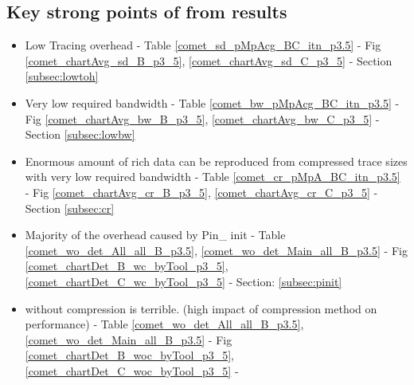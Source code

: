 \subsection{Key strong points of \parlot from results}

\begin{itemize}
\item Low Tracing overhead - Table \ref{comet_sd_pMpAcg_BC_itn_p3.5} - Fig \ref{comet_chartAvg_sd_B_p3_5}, \ref{comet_chartAvg_sd_C_p3_5} - Section \ref{subsec:lowtoh}
\item Very low required bandwidth - Table \ref{comet_bw_pMpAcg_BC_itn_p3.5} - Fig \ref{comet_chartAvg_bw_B_p3_5}, \ref{comet_chartAvg_bw_C_p3_5} - Section \ref{subsec:lowbw}
\item Enormous amount of rich data can be reproduced from compressed trace sizes with very low required bandwidth - Table \ref{comet_cr_pMpA_BC_itn_p3.5} - Fig \ref{comet_chartAvg_cr_B_p3_5}, \ref{comet_chartAvg_cr_C_p3_5} - Section \ref{subsec:cr}
\item Majority of the overhead caused by Pin\_ init - Table \ref{comet_wo_det_All_all_B_p3.5}, \ref{comet_wo_det_Main_all_B_p3.5} - Fig \ref{comet_chartDet_B_wc_byTool_p3_5}, \ref{comet_chartDet_C_wc_byTool_p3_5} - Section: \ref{subsec:pinit}
\item \parlot without compression is terrible. (high impact of compression method on performance) - Table \ref{comet_wo_det_All_all_B_p3.5}, \ref{comet_wo_det_Main_all_B_p3.5}  - Fig \ref{comet_chartDet_B_woc_byTool_p3_5}, \ref{comet_chartDet_C_woc_byTool_p3_5} - \cite{subsec:compact}
\end{itemize}

\vspace{1ex}
\vspace{1ex}


